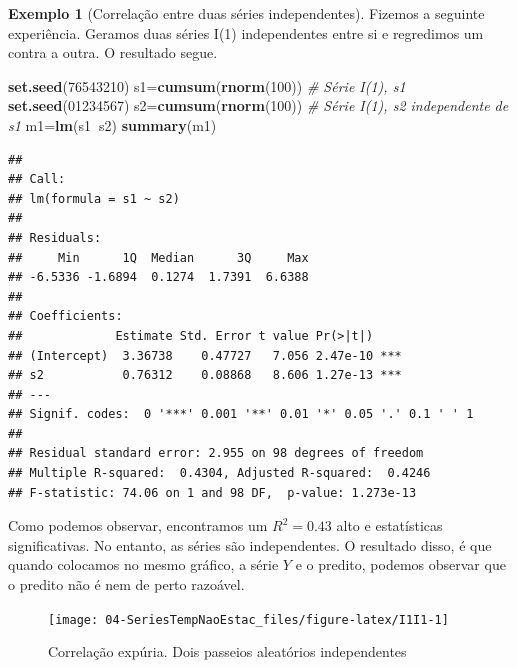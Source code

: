 \documentclass[
]{book}
\newenvironment{Shaded}{\begin{snugshade}}{\end{snugshade}}
\newcommand{\CommentTok}[1]{\textcolor[rgb]{0.56,0.35,0.01}{\textit{#1}}}
\newcommand{\DecValTok}[1]{\textcolor[rgb]{0.00,0.00,0.81}{#1}}
\newcommand{\KeywordTok}[1]{\textcolor[rgb]{0.13,0.29,0.53}{\textbf{#1}}}
\newcommand{\NormalTok}[1]{#1}
\newcommand{\OperatorTok}[1]{\textcolor[rgb]{0.81,0.36,0.00}{\textbf{#1}}}
\theoremstyle{definition}
\theoremstyle{definition}
\newtheorem{example}{Exemplo}[chapter]
\theoremstyle{definition}
\theoremstyle{remark}
\begin{document}
\begin{example}[Correlação entre duas séries independentes]
\protect\hypertarget{exm:passaleexp}{}{\label{exm:passaleexp} {} }Fizemos a seguinte experiência. Geramos duas séries I(1) independentes entre si e regredimos um contra a outra.
O resultado segue.
\end{example}

\begin{Shaded}
\begin{Highlighting}[]
\KeywordTok{set.seed}\NormalTok{(}\DecValTok{76543210}\NormalTok{)}
\NormalTok{s1=}\KeywordTok{cumsum}\NormalTok{(}\KeywordTok{rnorm}\NormalTok{(}\DecValTok{100}\NormalTok{)) }\CommentTok{# Série I(1), s1}
\KeywordTok{set.seed}\NormalTok{(}\DecValTok{01234567}\NormalTok{)}
\NormalTok{s2=}\KeywordTok{cumsum}\NormalTok{(}\KeywordTok{rnorm}\NormalTok{(}\DecValTok{100}\NormalTok{)) }\CommentTok{# Série I(1), s2 independente de s1}
\NormalTok{m1=}\KeywordTok{lm}\NormalTok{(s1}\OperatorTok{~}\NormalTok{s2)}
\KeywordTok{summary}\NormalTok{(m1)}
\end{Highlighting}
\end{Shaded}

\begin{verbatim}
## 
## Call:
## lm(formula = s1 ~ s2)
## 
## Residuals:
##     Min      1Q  Median      3Q     Max 
## -6.5336 -1.6894  0.1274  1.7391  6.6388 
## 
## Coefficients:
##             Estimate Std. Error t value Pr(>|t|)    
## (Intercept)  3.36738    0.47727   7.056 2.47e-10 ***
## s2           0.76312    0.08868   8.606 1.27e-13 ***
## ---
## Signif. codes:  0 '***' 0.001 '**' 0.01 '*' 0.05 '.' 0.1 ' ' 1
## 
## Residual standard error: 2.955 on 98 degrees of freedom
## Multiple R-squared:  0.4304,	Adjusted R-squared:  0.4246 
## F-statistic: 74.06 on 1 and 98 DF,  p-value: 1.273e-13
\end{verbatim}

Como podemos observar, encontramos um \(R^2=0.43\) alto e estatísticas significativas. No entanto, as séries são independentes. O resultado disso, é que quando colocamos no mesmo gráfico, a série \(Y\) e o predito, podemos observar que o predito não é nem de perto razoável.

\begin{figure}
\texttt{[image: 04-SeriesTempNaoEstac\_files/figure-latex/I1I1-1]} \caption{Correlação expúria. Dois passeios aleatórios independentes}\label{fig:I1I1}
\end{figure}
\end{document}
